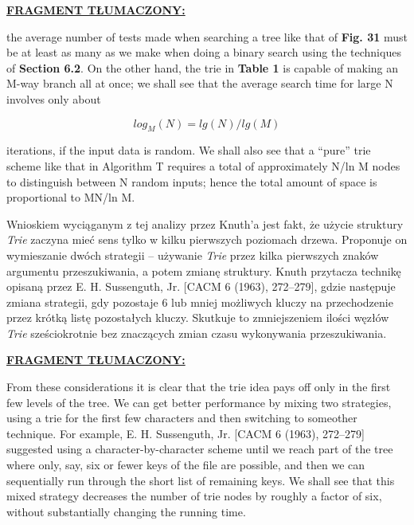 	\ifsourcematerial
	\begin{displayquote}
		\color{ao(english)}
		\underline{\textbf{FRAGMENT TŁUMACZONY:}} \newline
		
		the average number of tests made when searching a tree like that of \textbf{Fig. 31} must be at least as many as we make when
		doing a binary search using the techniques of \textbf{Section 6.2}.
		On the other hand, the trie in \textbf{Table 1} is capable of making an M-way branch
		all at once; we shall see that the average search time for large N involves only
		about 
		
		\begin{equation}
		log_M(N) = lg(N)/lg(M)
		\end{equation}
		
		iterations, if the input data is random. We shall also see that a “pure” trie scheme
		like that in Algorithm T requires a total of approximately N/ln M nodes to
		distinguish between N random inputs; hence the total amount of space is
		proportional to MN/ln M.
	\end{displayquote}
	\fi
	
	Wnioskiem wyciąganym z tej analizy przez Knuth'a jest fakt, że użycie struktury \emph{Trie} zaczyna mieć sens tylko w kilku pierwszych poziomach drzewa. Proponuje on wymieszanie dwóch strategii -- używanie \emph{Trie} przez kilka pierwszych znaków argumentu przeszukiwania, a potem zmianę struktury. Knuth przytacza technikę opisaną przez E. H. Sussenguth, Jr. [CACM 6 (1963), 272–279], gdzie następuje zmiana strategii, gdy pozostaje 6 lub mniej możliwych kluczy na przechodzenie przez krótką listę pozostałych kluczy. Skutkuje to zmniejszeniem ilości węzłów \emph{Trie} sześciokrotnie bez znaczących zmian czasu wykonywania przeszukiwania.
	
	\ifsourcematerial
	\begin{displayquote}
		\color{ao(english)}
		\underline{\textbf{FRAGMENT TŁUMACZONY:}} \newline
		
		From these considerations it is clear that the trie idea pays off only in the
		first few levels of the tree. We can get better performance by mixing two
		strategies, using a trie for the first few characters and then switching to someother technique. For example, E. H. Sussenguth, Jr. [CACM 6 (1963), 272–279]
		suggested using a character-by-character scheme until we reach part of the tree
		where only, say, six or fewer keys of the file are possible, and then we can
		sequentially run through the short list of remaining keys. We shall see that this
		mixed strategy decreases the number of trie nodes by roughly a factor of six,
		without substantially changing the running time.
	\end{displayquote}
	\fi
	
